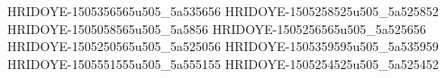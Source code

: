 HRIDOYE-1505356565u505_5a535656
HRIDOYE-1505258525u505_5a525852
HRIDOYE-1505058565u505_5a5856
HRIDOYE-1505256565u505_5a525656
HRIDOYE-1505250565u505_5a525056
HRIDOYE-1505359595u505_5a535959
HRIDOYE-1505551555u505_5a555155
HRIDOYE-1505254525u505_5a525452
